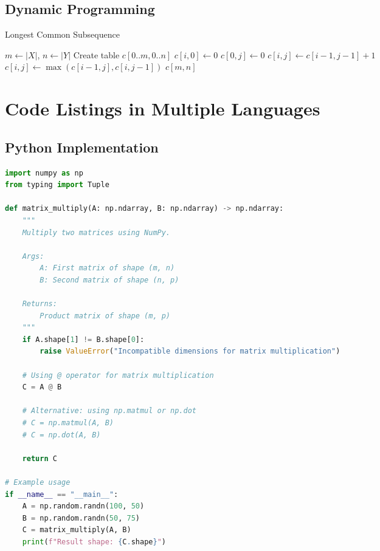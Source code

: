 \documentclass[11pt,a4paper]{article}
\theoremstyle{definition}
\begin{document}
\subsection{Dynamic Programming}

\begin{algorithm}[H]
\caption{Longest Common Subsequence}
\label{alg:lcs}
\begin{algorithmic}[1]
    \State $m \gets |X|$, $n \gets |Y|$
    \State Create table $c[0..m, 0..n]$
        \State $c[i, 0] \gets 0$
    \EndFor
        \State $c[0, j] \gets 0$
    \EndFor
                \State $c[i, j] \gets c[i-1, j-1] + 1$
            \Else
                \State $c[i, j] \gets \max(c[i-1, j], c[i, j-1])$
            \EndIf
        \EndFor
    \EndFor
    \State \Return $c[m, n]$
\EndFunction
\end{algorithmic}
\end{algorithm}

\section{Code Listings in Multiple Languages}

\subsection{Python Implementation}

\begin{lstlisting}[language=Python, caption=Matrix Multiplication in NumPy]
import numpy as np
from typing import Tuple

def matrix_multiply(A: np.ndarray, B: np.ndarray) -> np.ndarray:
    """
    Multiply two matrices using NumPy.
    
    Args:
        A: First matrix of shape (m, n)
        B: Second matrix of shape (n, p)
    
    Returns:
        Product matrix of shape (m, p)
    """
    if A.shape[1] != B.shape[0]:
        raise ValueError("Incompatible dimensions for matrix multiplication")
    
    # Using @ operator for matrix multiplication
    C = A @ B
    
    # Alternative: using np.matmul or np.dot
    # C = np.matmul(A, B)
    # C = np.dot(A, B)
    
    return C

# Example usage
if __name__ == "__main__":
    A = np.random.randn(100, 50)
    B = np.random.randn(50, 75)
    C = matrix_multiply(A, B)
    print(f"Result shape: {C.shape}")
\end{lstlisting}
\end{document}

